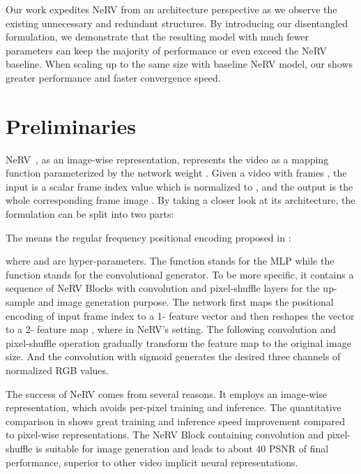 \documentclass[runningheads]{llncs}
\begin{document}
Our work expedites NeRV from an architecture perspective as we observe the existing unnecessary and redundant structures. By introducing our disentangled formulation, we demonstrate that the resulting model with much fewer parameters can keep the majority of performance or even exceed the NeRV baseline. When scaling up to the same size with baseline NeRV model, our \netname shows greater performance and faster convergence speed. \section{Preliminaries}
\label{Preliminaries}

NeRV~\cite{chen2021nerv}, as an image-wise representation, represents the video as a mapping function  parameterized by the network weight . Given a video with  frames , the input is a scalar frame index value which is normalized to , and the output is the whole corresponding frame image . By taking a closer look at its architecture, the formulation can be split into two parts:


The  means the regular frequency positional encoding proposed in \cite{mildenhall2020nerf}:


where  and  are hyper-parameters. The function  stands for the MLP while the function  stands for the convolutional generator. To be more specific, it contains a sequence of NeRV Blocks with convolution and pixel-shuffle layers for the up-sample and image generation purpose. The network first maps the positional encoding of input frame index to a 1- feature vector and then reshapes the vector to a 2- feature map , where  in NeRV's setting. The following convolution and pixel-shuffle operation gradually transform the feature map to the original image size. And the  convolution with sigmoid generates the desired three channels of normalized RGB values.

The success of NeRV comes from several reasons. It employs an image-wise representation, which avoids per-pixel training and inference. The quantitative comparison in \cite{chen2021nerv} shows great training and inference speed improvement compared to pixel-wise representations. The NeRV Block containing convolution and pixel-shuffle is suitable for image generation and leads to about 40 PSNR of final performance, superior to other video implicit neural representations.
\end{document}
